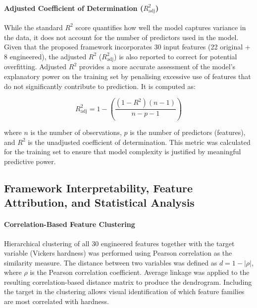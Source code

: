 \documentclass[pdflatex,sn-mathphys-num]{sn-jnl}%
\newif\ifrevmarks%
\newcommand{\revmark}[1]{\ifrevmarks\textcolor{revblue}{#1}\else#1\fi}%
\theoremstyle{thmstyleone}%
\theoremstyle{thmstyletwo}%
\theoremstyle{thmstylethree}%
\begin{document}
\paragraph{Adjusted Coefficient of Determination ($R^2_{\text{adj}}$)}  
\revmark{While the standard $R^2$ score quantifies how well the model captures variance in the data, it does not account for the number of predictors used in the model. Given that the proposed framework incorporates 30 input features (22 original + 8 engineered), the adjusted $R^2$ ($R^2_{\text{adj}}$) is also reported to correct for potential overfitting. Adjusted $R^2$ provides a more accurate assessment of the model’s explanatory power on the training set by penalising excessive use of features that do not significantly contribute to prediction. It is computed as:}

\begin{equation}
\label{eq:adjusted_r2}
R^2_{\text{adj}} = 1 - \left( \frac{(1 - R^2)(n - 1)}{n - p - 1} \right)
\end{equation}

where $n$ is the number of observations, $p$ is the number of predictors (features), and $R^2$ is the unadjusted coefficient of determination. This metric was calculated for the training set to ensure that model complexity is justified by meaningful predictive power.


\subsection{Framework Interpretability, Feature Attribution, and Statistical Analysis}

\paragraph{Correlation-Based Feature Clustering}
Hierarchical clustering of all 30 engineered features together with the target variable (Vickers hardness) was performed using Pearson correlation as the similarity measure. The distance between two variables was defined as $d = 1 - |\rho|$, where $\rho$ is the Pearson correlation coefficient. Average linkage was applied to the resulting correlation-based distance matrix to produce the dendrogram. Including the target in the clustering allows visual identification of which feature families are most correlated with hardness.
\end{document}
